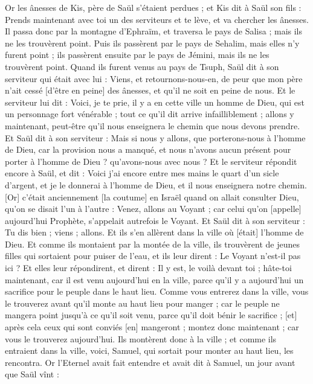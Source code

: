 \begin{multicols}{2}
Or les ânesses de Kis, père de Saül s'étaient perdues ; et Kis dit à Saül son fils : Prends maintenant avec toi un des serviteurs et te lève, et va chercher les ânesses.
Il passa donc par la montagne d'Ephraïm, et traversa le pays de Salisa ; mais ils ne les trouvèrent point. Puis ils passèrent par le pays de Sehalim, mais elles n'y furent point ; ils passèrent ensuite par le pays de Jémini, mais ils ne les trouvèrent point.
Quand ils furent venus au pays de Tsuph, Saül dit à son serviteur qui était avec lui : Viens, et retournons-nous-en, de peur que mon père n'ait cessé [d'être en peine] des ânesses, et qu'il ne soit en peine de nous.
Et le serviteur lui dit : Voici, je te prie, il y a en cette ville un homme de Dieu, qui est un personnage fort vénérable ; tout ce qu'il dit arrive infailliblement ; allons y maintenant, peut-être qu'il nous enseignera le chemin que nous devons prendre.
Et Saül dit à son serviteur : Mais si nous y allons, que porterons-nous à l'homme de Dieu, car la provision nous a manqué, et nous n'avons aucun présent pour porter à l'homme de Dieu ? qu'avons-nous avec nous ?
Et le serviteur répondit encore à Saül, et dit : Voici j'ai encore entre mes mains le quart d'un sicle d'argent, et je le donnerai à l'homme de Dieu, et il nous enseignera notre chemin.
[Or] c'était anciennement [la coutume] en Israël quand on allait consulter Dieu, qu'on se disait l'un à l'autre : Venez, allons au Voyant ; car celui qu'on [appelle] aujourd'hui Prophète, s'appelait autrefois le Voyant.
Et Saül dit à son serviteur : Tu dis bien ; viens ; allons. Et ils s'en allèrent dans la ville où [était] l'homme de Dieu.
Et comme ils montaient par la montée de la ville, ils trouvèrent de jeunes filles qui sortaient pour puiser de l'eau, et ils leur dirent : Le Voyant n'est-il pas ici ?
Et elles leur répondirent, et dirent : Il y est, le voilà devant toi ; hâte-toi maintenant, car il est venu aujourd'hui en la ville, parce qu'il y a aujourd'hui un sacrifice pour le peuple dans le haut lieu.
Comme vous entrerez dans la ville, vous le trouverez avant qu'il monte au haut lieu pour manger ; car le peuple ne mangera point jusqu'à ce qu'il soit venu, parce qu'il doit bénir le sacrifice ; [et] après cela ceux qui sont conviés [en] mangeront ; montez donc maintenant ; car vous le trouverez aujourd'hui.
Ils montèrent donc à la ville ; et comme ils entraient dans la ville, voici, Samuel, qui sortait pour monter au haut lieu, les rencontra.
Or l'Eternel avait fait entendre et avait dit à Samuel, un jour avant que Saül vînt :

\end{multicols}
